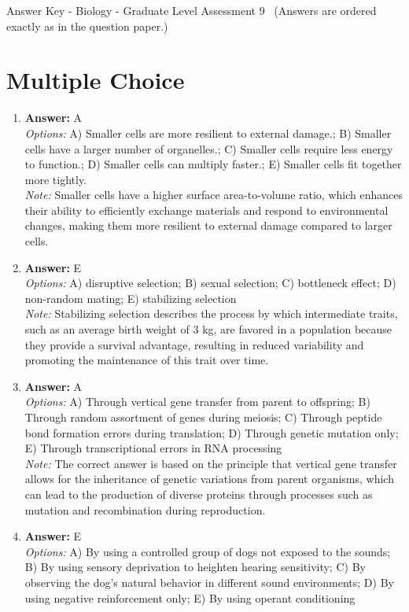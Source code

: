 \documentclass[12pt]{article}
\begin{document}
\begin{center}
Answer Key - Biology - Graduate Level Assessment 9 \
\small (Answers are ordered exactly as in the question paper.)
\end{center}

\section*{Multiple Choice}
\begin{enumerate}[label=\arabic*.]
\item \textbf{Answer:} A
\\ \textit{Options:} A) Smaller cells are more resilient to external damage.; B) Smaller cells have a larger number of organelles.; C) Smaller cells require less energy to function.; D) Smaller cells can multiply faster.; E) Smaller cells fit together more tightly.
\\ \textit{Note:} Smaller cells have a higher surface area-to-volume ratio, which enhances their ability to efficiently exchange materials and respond to environmental changes, making them more resilient to external damage compared to larger cells.
\item \textbf{Answer:} E
\\ \textit{Options:} A) disruptive selection; B) sexual selection; C) bottleneck effect; D) non-random mating; E) stabilizing selection
\\ \textit{Note:} Stabilizing selection describes the process by which intermediate traits, such as an average birth weight of 3 kg, are favored in a population because they provide a survival advantage, resulting in reduced variability and promoting the maintenance of this trait over time.
\item \textbf{Answer:} A
\\ \textit{Options:} A) Through vertical gene transfer from parent to offspring; B) Through random assortment of genes during meiosis; C) Through peptide bond formation errors during translation; D) Through genetic mutation only; E) Through transcriptional errors in RNA processing
\\ \textit{Note:} The correct answer is based on the principle that vertical gene transfer allows for the inheritance of genetic variations from parent organisms, which can lead to the production of diverse proteins through processes such as mutation and recombination during reproduction.
\item \textbf{Answer:} E
\\ \textit{Options:} A) By using a controlled group of dogs not exposed to the sounds; B) By using sensory deprivation to heighten hearing sensitivity; C) By observing the dog's natural behavior in different sound environments; D) By using negative reinforcement only; E) By using operant conditioning

\end{enumerate}
\end{document}

